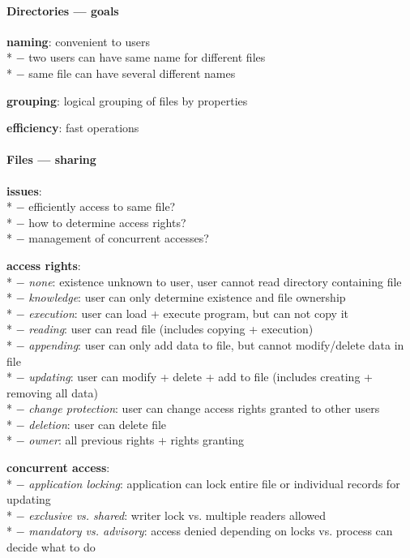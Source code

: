 \paragraph{Directories --- goals}
\begin{items}
  \item \textbf{naming}: convenient to users \\*
    $ - $ two users can have same name for different files \\*
    $ - $ same file can have several different names
  \item \textbf{grouping}: logical grouping of files by properties
  \item \textbf{efficiency}: fast operations
\end{items}

\paragraph{Files --- sharing}
\begin{items}
  \item \textbf{issues}: \\*
    $ - $ efficiently access to same file? \\*
    $ - $ how to determine access rights? \\*
    $ - $ management of concurrent accesses?
  \item \textbf{access rights}: \\*
    $ - $ \emph{none}: existence unknown to user, user cannot read directory containing file \\*
    $ - $ \emph{knowledge}: user can only determine existence and file ownership \\*
    $ - $ \emph{execution}: user can load + execute program, but can not copy it \\*
    $ - $ \emph{reading}: user can read file (includes copying + execution) \\*
    $ - $ \emph{appending}: user can only add data to file, but cannot modify/delete data in file \\*
    $ - $ \emph{updating}: user can modify + delete + add to file (includes creating + removing all data) \\*
    $ - $ \emph{change protection}: user can change access rights granted to other users \\*
    $ - $ \emph{deletion}: user can delete file \\*
    $ - $ \emph{owner}: all previous rights + rights granting
  \item \textbf{concurrent access}: \\*
    $ - $ \emph{application locking}: application can lock entire file or individual records for updating \\*
    $ - $ \emph{exclusive vs. shared}: writer lock vs. multiple readers allowed \\*
    $ - $ \emph{mandatory vs. advisory}: access denied depending on locks vs. process can decide what to do
\end{items}